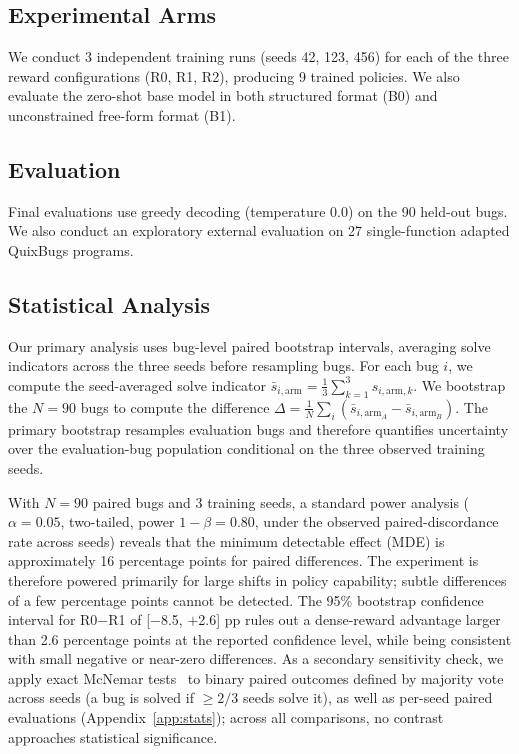 \documentclass{article}
\begin{document}
\subsection{Experimental Arms}
We conduct 3 independent training runs (seeds 42, 123, 456) for each of the three reward configurations (R0, R1, R2), producing 9 trained policies. We also evaluate the zero-shot base model in both structured format (B0) and unconstrained free-form format (B1).

\subsection{Evaluation}
Final evaluations use greedy decoding (temperature 0.0) on the 90 held-out bugs. We also conduct an exploratory external evaluation on 27 single-function adapted QuixBugs programs.

\subsection{Statistical Analysis}
Our primary analysis uses bug-level paired bootstrap intervals, averaging solve indicators across the three seeds before resampling bugs. For each bug $i$, we compute the seed-averaged solve indicator $\bar{s}_{i,\text{arm}} = \frac{1}{3}\sum_{k=1}^{3}s_{i,\text{arm},k}$. We bootstrap the $N=90$ bugs to compute the difference $\Delta = \frac{1}{N}\sum_i (\bar{s}_{i,\text{arm}_A}-\bar{s}_{i,\text{arm}_B})$. The primary bootstrap resamples evaluation bugs and therefore quantifies uncertainty over the evaluation-bug population conditional on the three observed training seeds. 

With $N=90$ paired bugs and 3 training seeds, a standard power analysis ($\alpha=0.05$, two-tailed, power $1-\beta=0.80$, under the observed paired-discordance rate across seeds) reveals that the minimum detectable effect (MDE) is approximately 16 percentage points for paired differences. The experiment is therefore powered primarily for large shifts in policy capability; subtle differences of a few percentage points cannot be detected. The 95\% bootstrap confidence interval for R0$-$R1 of [$-$8.5, $+$2.6] pp rules out a dense-reward advantage larger than 2.6 percentage points at the reported confidence level, while being consistent with small negative or near-zero differences. As a secondary sensitivity check, we apply exact McNemar tests~\cite{McNemar1947} to binary paired outcomes defined by majority vote across seeds (a bug is solved if $\ge 2/3$ seeds solve it), as well as per-seed paired evaluations (Appendix~\ref{app:stats}); across all comparisons, no contrast approaches statistical significance.
\end{document}
